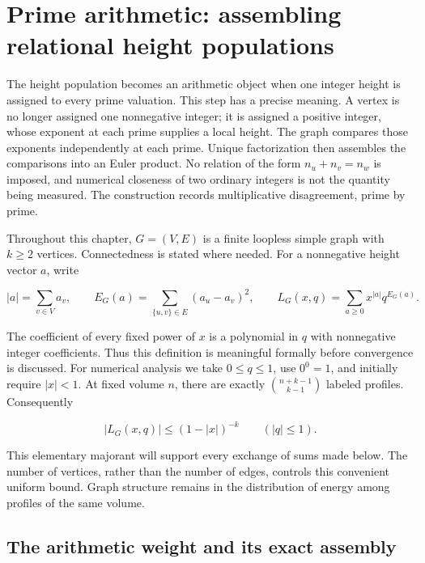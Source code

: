 \documentclass[
  11pt,
  a4paper,
]{report}
\begin{document}
\hypertarget{prime-arithmetic-assembling-relational-height-populations}{%
\chapter{Prime arithmetic: assembling relational height
populations}\label{prime-arithmetic-assembling-relational-height-populations}}

The height population becomes an arithmetic object when one integer
height is assigned to every prime valuation. This step has a precise
meaning. A vertex is no longer assigned one nonnegative integer; it is
assigned a positive integer, whose exponent at each prime supplies a
local height. The graph compares those exponents independently at each
prime. Unique factorization then assembles the comparisons into an Euler
product. No relation of the form \(n_u+n_v=n_w\) is imposed, and
numerical closeness of two ordinary integers is not the quantity being
measured. The construction records multiplicative disagreement, prime by
prime.

Throughout this chapter, \(G=(V,E)\) is a finite loopless simple graph
with \(k\ge2\) vertices. Connectedness is stated where needed. For a
nonnegative height vector \(a\), write

\[
 |a|=\sum_{v\in V}a_v,\qquad
 E_G(a)=\sum_{\{u,v\}\in E}(a_u-a_v)^2,
 \qquad
 L_G(x,q)=\sum_{a\ge0}x^{|a|}q^{E_G(a)}.
\]

The coefficient of every fixed power of \(x\) is a polynomial in \(q\)
with nonnegative integer coefficients. Thus this definition is
meaningful formally before convergence is discussed. For numerical
analysis we take \(0\le q\le1\), use \(0^0=1\), and initially require
\(|x|<1\). At fixed volume \(n\), there are exactly
\(\binom{n+k-1}{k-1}\) labeled profiles. Consequently

\[
 |L_G(x,q)|\le(1-|x|)^{-k}\qquad(|q|\le1).
\]

This elementary majorant will support every exchange of sums made below.
The number of vertices, rather than the number of edges, controls this
convenient uniform bound. Graph structure remains in the distribution of
energy among profiles of the same volume.

\hypertarget{the-arithmetic-weight-and-its-exact-assembly}{%
\section{The arithmetic weight and its exact
assembly}\label{the-arithmetic-weight-and-its-exact-assembly}}
\end{document}
